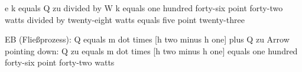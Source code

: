 e k equals Q zu divided by W k equals one hundred forty-six point forty-two watts divided by twenty-eight watts equals five point twenty-three  

EB (Fließprozess):  
Q equals m dot times [h two minus h one] plus Q zu  
Arrow pointing down: Q zu equals m dot times [h two minus h one] equals one hundred forty-six point forty-two watts